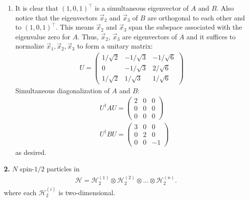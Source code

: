 \documentclass{article}
\theoremstyle{definition}
\newcommand{\ham}{\mathcal{H}}
\begin{document}
\begin{enumerate}[label=(\alph*)]
	
	\item It is clear that $(1,0,1)^\top$ is a simultaneous eigenvector of $A$ and $B$. Also notice that the eigenvectors $\vec{x}_2$ and $\vec{x}_3$ of $B$ are orthogonal to each other and to $(1,0,1)^\top$. This means $\vec{x}_2$ and $\vec{x}_3$ span the subspace associated with the eigenvalue zero for $A$. Thus, $\vec{x}_2$, $\vec{x}_3$ are eigenvectors of $A$ and it suffices to normalize $\vec{x}_1, \vec{x}_2, \vec{x}_3$ to form a unitary matrix:
	\begin{align*}
	\boxed{U = \begin{pmatrix}
	1/\sqrt{2}  & -1/\sqrt{3} & -1/\sqrt{6}  \\
	0 & -1/\sqrt{3} & 2/\sqrt{6}   \\
	1 /\sqrt{2} & 1/\sqrt{3} & 1/\sqrt{6} 	
	\end{pmatrix}}
	\end{align*} 
	Simultaneous diagonalization of $A$ and $B$:
	\begin{align*}
	&U^\dagger A U = \begin{pmatrix}
	2 & 0 & 0 \\
	0&0&0\\
	0&0&0
	\end{pmatrix}\\
	&U^\dagger B U = \begin{pmatrix}
	3 & 0 & 0 \\
	0 & 2 & 0 \\ 
	0 & 0 & -1
	\end{pmatrix}
	\end{align*}
	as desired.
\end{enumerate}



\noindent \textbf{2. } $N$ spin-$1/2$ particles in 
\begin{align*}
\ham = \ham_2^{(1)} \otimes \ham_2^{(2)} \otimes \dots \otimes \ham_2^{(n)}.
\end{align*}
where each $\ham_2^{(i)}$ is two-dimensional.
\end{document}
